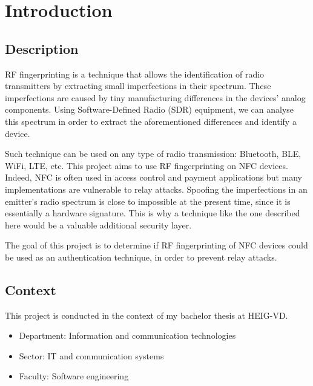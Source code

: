 \section{Introduction}
\subsection{Description}
RF fingerprinting is a technique that allows the identification of radio transmitters by extracting small imperfections in their spectrum. These imperfections are caused by tiny manufacturing differences in the devices' analog components. Using Software-Defined Radio (SDR) equipment, we can analyse this spectrum in order to extract the aforementioned differences and identify a device.

Such technique can be used on any type of radio transmission: Bluetooth, BLE, WiFi, LTE, etc. This project aims to use RF fingerprinting on NFC devices. Indeed, NFC is often used in access control and payment applications but many implementations are vulnerable to relay attacks. Spoofing the imperfections in an emitter's radio spectrum is close to impossible at the present time, since it is essentially a hardware signature. This is why a technique like the one described here would be a valuable additional security layer.

The goal of this project is to determine if RF fingerprinting of NFC devices could be used as an authentication technique, in order to prevent relay attacks.

\subsection{Context}
This project is conducted in the context of my bachelor thesis at HEIG-VD.

\begin{itemize}
  \item Department: Information and communication technologies
  \item Sector: IT and communication systems
  \item Faculty: Software engineering
\end{itemize}
